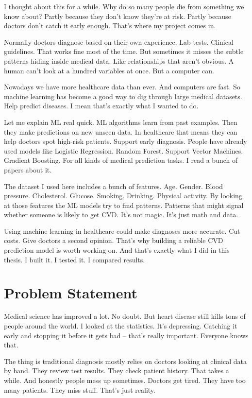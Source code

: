 \documentclass[12pt, a4paper, oneside]{book}
\begin{document}
I thought about this for a while. Why do so many people die from something we know about? Partly because they don't know they're at risk. Partly because doctors don't catch it early enough. That's where my project comes in.

Normally doctors diagnose based on their own experience. Lab tests. Clinical guidelines. That works fine most of the time. But sometimes it misses the subtle patterns hiding inside medical data. Like relationships that aren't obvious. A human can't look at a hundred variables at once. But a computer can.

Nowadays we have more healthcare data than ever. And computers are fast. So machine learning has become a good way to dig through large medical datasets. Help predict diseases. I mean that's exactly what I wanted to do.

Let me explain ML real quick. ML algorithms learn from past examples. Then they make predictions on new unseen data. In healthcare that means they can help doctors spot high-risk patients. Support early diagnosis. People have already used models like Logistic Regression. Random Forest. Support Vector Machines. Gradient Boosting. For all kinds of medical prediction tasks. I read a bunch of papers about it.

The dataset I used here includes a bunch of features. Age. Gender. Blood pressure. Cholesterol. Glucose. Smoking. Drinking. Physical activity. By looking at those features the ML models try to find patterns. Patterns that might signal whether someone is likely to get CVD. It's not magic. It's just math and data.

Using machine learning in healthcare could make diagnoses more accurate. Cut costs. Give doctors a second opinion. That's why building a reliable CVD prediction model is worth working on. And that's exactly what I did in this thesis. I built it. I tested it. I compared results.

\section{Problem Statement}

Medical science has improved a lot. No doubt. But heart disease still kills tons of people around the world. I looked at the statistics. It's depressing. Catching it early and stopping it before it gets bad -- that's really important. Everyone knows that.

The thing is traditional diagnosis mostly relies on doctors looking at clinical data by hand. They review test results. They check patient history. That takes a while. And honestly people mess up sometimes. Doctors get tired. They have too many patients. They miss stuff. That's just reality.
\end{document}
